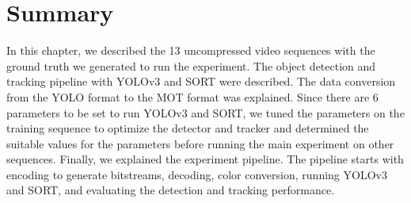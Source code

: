 \section{Summary}
\label{sec:methods/summary}

In this chapter, we described the 13 uncompressed video sequences with the ground truth we generated to run the experiment. The object detection and tracking pipeline with YOLOv3 and SORT were described. The data conversion from the YOLO format to the MOT format was explained. Since there are 6 parameters to be set to run YOLOv3 and SORT, we tuned the parameters on the training sequence to optimize the detector and tracker and determined the suitable values for the parameters before running the main experiment on other sequences. Finally, we explained the experiment pipeline. The pipeline starts with encoding to generate bitstreams, decoding, color conversion, running YOLOv3 and SORT, and evaluating the detection and tracking performance.